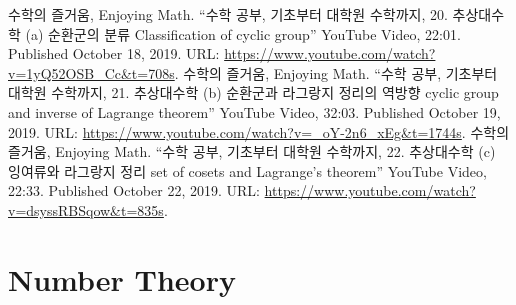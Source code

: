\documentclass[11pt,openany]{article}
\begin{document}
\vfill
\begin{thebibliography}{9}
	수학의 즐거움, Enjoying Math. ``수학 공부, 기초부터 대학원 수학까지, 20. 추상대수학 (a) 순환군의 분류 Classification of cyclic group'' YouTube Video, 22:01. Published 
	October 18, 2019. URL: \url{https://www.youtube.com/watch?v=1yQ52OSB_Cc&t=708s}.
	수학의 즐거움, Enjoying Math. ``수학 공부, 기초부터 대학원 수학까지, 21. 추상대수학 (b) 순환군과 라그랑지 정리의 역방향 cyclic group and inverse of Lagrange theorem'' YouTube Video, 32:03. Published 
	October 19, 2019. URL: \url{https://www.youtube.com/watch?v=_oY-2n6_xEg&t=1744s}.
	수학의 즐거움, Enjoying Math. ``수학 공부, 기초부터 대학원 수학까지, 22. 추상대수학 (c) 잉여류와 라그랑지 정리 set of cosets and Lagrange's theorem'' YouTube Video, 22:33. Published 
	October 22, 2019. URL: \url{https://www.youtube.com/watch?v=dsyssRBSqow&t=835s}.
\end{thebibliography}

\newpage
\appendix
\section{Number Theory}
\end{document}
